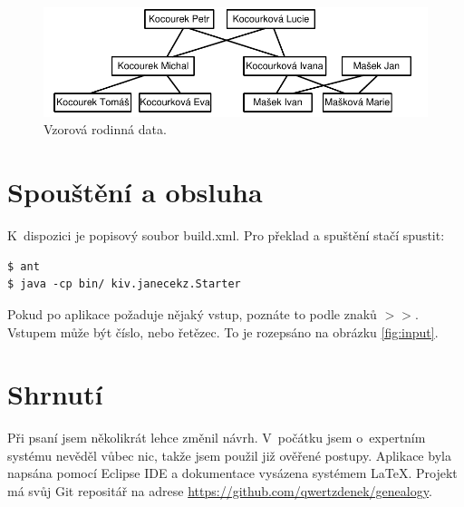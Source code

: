 \documentclass[a4paper, 12pt]{article}
\begin{document}
\begin{figure}
\centering
\includegraphics[width=\textwidth]{testData}
\caption{Vzorová rodinná data.}
\label{fig:family}
\end{figure}

\section{Spouštění a obsluha}
K~dispozici je popisový soubor \textsf{build.xml}. Pro překlad a spuštění
stačí spustit:
\begin{verbatim}
$ ant
$ java -cp bin/ kiv.janecekz.Starter
\end{verbatim}

Pokud po aplikace požaduje nějaký vstup, poznáte to podle
znaků $>>$. Vstupem může být číslo, nebo řetězec. To je
rozepsáno na obrázku \ref{fig:input}.

\section{Shrnutí}
Při psaní jsem několikrát lehce změnil návrh. V~počátku jsem o~expertním
systému nevěděl vůbec nic, takže jsem použil již ověřené postupy.
Aplikace byla napsána pomocí Eclipse IDE a dokumentace vysázena systémem
\LaTeX{}. Projekt má svůj Git repositář na adrese
\url{https://github.com/qwertzdenek/genealogy}.
\end{document}
